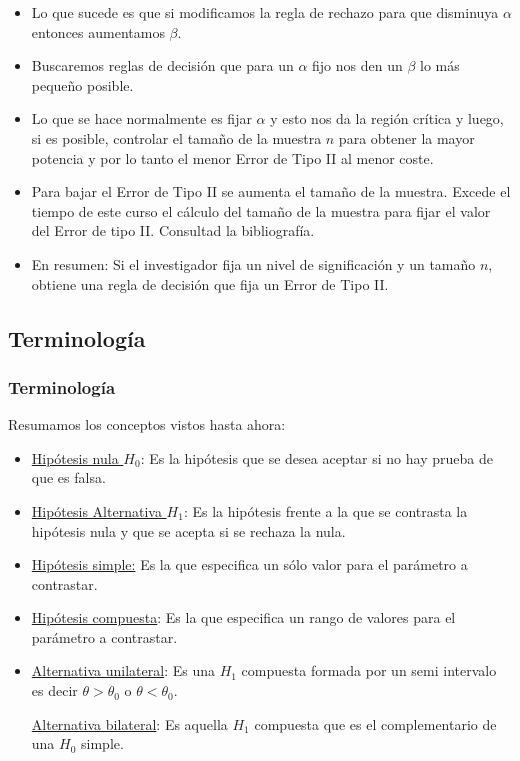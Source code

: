 \begin{frame}
\begin{itemize}
\item Lo que sucede es que si modificamos la regla de rechazo para que disminuya $\alpha$ entonces aumentamos $\beta$.
\item Buscaremos  reglas de decisión que para un $\alpha$ fijo nos den un $\beta$ lo más pequeño posible.
\item Lo que se hace normalmente es fijar $\alpha$ y esto  nos da la región crítica y luego, si es posible, controlar el tamaño de la muestra $n$ para
 obtener la mayor potencia y por lo tanto el menor Error de Tipo II
al menor coste.
\item  Para bajar el Error de Tipo II se aumenta el tamaño de la muestra. Excede el tiempo de este curso el cálculo del tamaño de la muestra para fijar el valor del Error de tipo II. Consultad la bibliografía.
\item En resumen: Si el investigador fija un nivel de significación y un tamaño $n$, obtiene una regla de
    decisión que fija un Error de Tipo II.
\end{itemize}
\end{frame}

\subsection{Terminología}
\begin{frame}
\frametitle{Terminología}
 Resumamos los conceptos vistos hasta
ahora:
\begin{itemize}
\item \underline{Hipótesis nula $H_{0}$}: Es la hipótesis que se desea aceptar si no hay prueba
de que es falsa.

\item \underline{Hipótesis Alternativa $H_{1}$}: Es la hipótesis frente a la que se contrasta
la hipótesis nula y que se acepta si se rechaza la nula.

\item \underline{Hipótesis simple:} Es la que especifica un sólo valor para el parámetro a
contrastar.

\item \underline{Hipótesis compuesta}:  Es la que especifica un rango de valores para el
parámetro a contrastar.

\item \underline{Alternativa unilateral}: Es una $H_{1}$ compuesta formada por un semi intervalo
es decir $\theta>\theta_{0}$ o $\theta<\theta_{0}$.

\underline{Alternativa bilateral}:   Es aquella $H_{1}$ compuesta que es el
complementario de una $H_{0}$ simple.


\end{itemize}
\end{frame}

